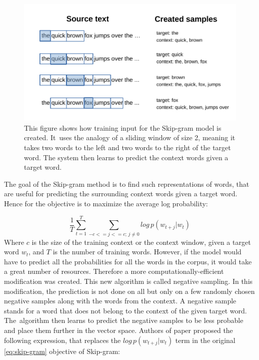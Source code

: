 \begin{figure}[H]
    \centering
    \includegraphics{obrazky-figures/sliding_window.pdf}
    \caption{This figure shows how training input for the Skip-gram model is created. It~uses the analogy of a sliding window of size 2, meaning it takes two words to the left and two words to the right of the target word. The system then learns to predict the context words given a target word. \cite{Sliding_figure}}
\end{figure}

The goal of the Skip-gram method is to find such representations of words, that are useful for predicting the surrounding context words given a target word. Hence for the objective is to maximize the average log probability:

\begin{equation} \label{eq:skip-gram}
    \frac{1}{T} \sum_{t=1}^T \sum_{-c <= j <= c; \, j \neq 0} log \, p(w_{t+j} | w_t)
\end{equation}
Where $c$ is the size of the training context or the context window, given a target word $w_t$, and $T$ is the number of training words.
However, if the model would have to predict all the probabilities for all the words in the corpus, it would take a great number of resources. Therefore a more computationally-efficient modification was created. This new algorithm is called negative sampling.
In this modification, the prediction is not done on all but only on a few randomly chosen negative samples along with the words from the context. A negative sample stands for a word that does not belong to the context of the given target word. The~algorithm then learns to predict the negative samples to be less probable and place them further in the vector space. Authors of paper \cite{Skip-gram} proposed the following expression, that replaces the $log \, p(w_{t+j} | w_t)$ term in the original \ref{eq:skip-gram} objective of Skip-gram:

